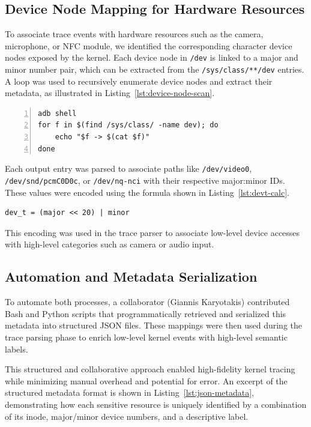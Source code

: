 \documentclass[a4paper,12pt]{report}
\begin{document}
\subsection{Device Node Mapping for Hardware Resources}

To associate trace events with hardware resources such as the camera, microphone, or NFC module, we identified the corresponding character device nodes exposed by the kernel. Each device node in \texttt{/dev} is linked to a major and minor number pair, which can be extracted from the \texttt{/sys/class/**/dev} entries. A loop was used to recursively enumerate device nodes and extract their metadata, as illustrated in Listing~\ref{lst:device-node-scan}.

\begin{lstlisting}[caption={Enumerating character and block devices with major:minor IDs},label={lst:device-node-scan},numbers=left]
adb shell
for f in $(find /sys/class/ -name dev); do
    echo "$f -> $(cat $f)"
done
\end{lstlisting}

Each output entry was parsed to associate paths like \texttt{/dev/video0}, \texttt{/dev/snd/pcmC0D0c}, or \texttt{/dev/nq-nci} with their respective major:minor IDs. These values were encoded using the formula shown in Listing~\ref{lst:devt-calc}.

\begin{lstlisting}[caption={Encoding device number using major and minor},label={lst:devt-calc},numbers=none]
dev_t = (major << 20) | minor
\end{lstlisting}

This encoding was used in the trace parser to associate low-level device accesses with high-level categories such as camera or audio input.

\subsection{Automation and Metadata Serialization}

To automate both processes, a collaborator (Giannis Karyotakis) contributed Bash and Python scripts that programmatically retrieved and serialized this metadata into structured JSON files. These mappings were then used during the trace parsing phase to enrich low-level kernel events with high-level semantic labels.

This structured and collaborative approach enabled high-fidelity kernel tracing while minimizing manual overhead and potential for error.
An excerpt of the structured metadata format is shown in Listing~\ref{lst:json-metadata}, demonstrating how each sensitive resource is uniquely identified by a combination of its inode, major/minor device numbers, and a descriptive label.
\end{document}
